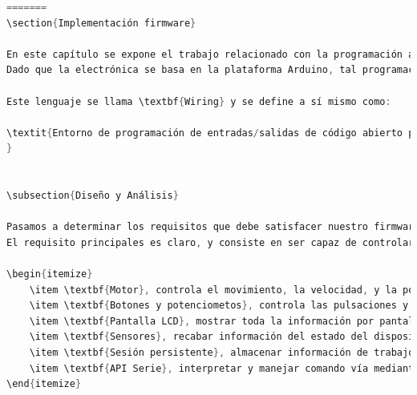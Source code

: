 \begin{lstlisting}[language=cpp, caption={Núcleo implementación firmware  ardufocuser},label={lst:nucleo_firmware_ardufocuser}]
=======
\section{Implementación firmware}

En este capítulo se expone el trabajo relacionado con la programación a bajo nivel realizada sobre la electrónica propuesta en el capítulo Módulo Hardware.
Dado que la electrónica se basa en la plataforma Arduino, tal programación se realiza usando su propio lenguaje,  implementado en C/C++.

Este lenguaje se llama \textbf{Wiring} y se define a sí mismo como:

\textit{Entorno de programación de entradas/salidas de código abierto para explorar las artes electrónicas, los medios materiales, la enseñanza y el aprendizaje de la programación informática y creación de prototipos con electrónica.
}


\subsection{Diseño y Análisis}

Pasamos a determinar los requisitos que debe satisfacer nuestro firmware.
El requisito principales es claro, y consiste en ser capaz de controlar y manejar toda la información todos los periféricos  los datos que arrojan, ello se puede desglosar:

\begin{itemize}
	\item \textbf{Motor}, controla el movimiento, la velocidad, y la posición. 
	\item \textbf{Botones y potenciometos}, controla las pulsaciones y el cambio en el valor de los potenciometros, para controlar el dispositivo de forma manual. 
	\item \textbf{Pantalla LCD}, mostrar toda la información por pantalla.
	\item \textbf{Sensores}, recabar información del estado del dispositivo, temperatura, fines de recorrido.
	\item \textbf{Sesión persistente}, almacenar información de trabajo a otra.
	\item \textbf{API Serie}, interpretar y manejar comando vía mediante comunicación puerto serie, para permitir controlar el dispositivo desde un host.
\end{itemize}


\end{lstlisting}
